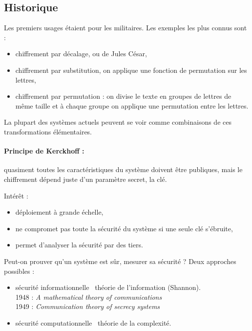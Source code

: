 \subsection{Historique}

	Les premiers usages étaient pour les militaires.
	Les exemples les plus connus sont :
	\begin{itemize}
		\item[\textbullet] chiffrement par décalage, ou de Jules César,
		\item[\textbullet] chiffrement par substitution, on applique une fonction de permutation sur les lettres,
		\item[\textbullet] chiffrement par permutation : on divise le texte en groupes de lettres de même taille et à chaque groupe on applique une permutation entre les lettres.
	\end{itemize}
	
	La plupart des systèmes actuels peuvent se voir comme combinaisons de ces transformations élémentaires.
	
	\paragraph{Principe de Kerckhoff :} quasiment toutes les caractéristiques du système doivent être publiques, mais le chiffrement dépend juste d'un paramètre secret, la clé.
	
	Intérêt :
	\begin{itemize}
		\item[\textbullet] déploiement à grande échelle,
		\item[\textbullet] ne compromet pas toute la sécurité du système si une seule clé s'ébruite,
		\item[\textbullet] permet d'analyser la sécurité par des tiers.\\
	\end{itemize}
	
	Peut-on prouver qu'un système est sûr, mesurer sa sécurité ?
	Deux approches possibles :
	\begin{itemize}
		\item[\textbullet] sécurité informationnelle \textrightarrow\ théorie de l'information (Shannon).\\
			1948 : \textit{A mathematical theory of communications}\\
			1949 : \textit{Communication theory of secrecy systems}
		\item[\textbullet] sécurité computationnelle \textrightarrow\ théorie de la complexité.
	\end{itemize}


